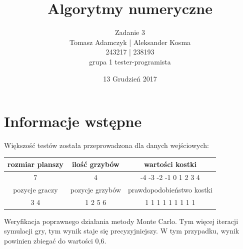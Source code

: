 \documentclass[8pt]{article}
\title{Algorytmy numeryczne}
\author{Zadanie 3 \\ Tomasz Adamczyk | Aleksander Kosma\\243217 | 238193\\grupa 1 tester-programista}
\date{13 Grudzień 2017}
\begin{document}
\maketitle 

\section*{Informacje wstępne}
Większość testów została przeprowadzona dla danych wejściowych:\\

\begin{center}
\begin{tabular}{  | c | c | c | }
  \hline
  rozmiar planszy & ilość grzybów & wartości kostki \\\hline
  7 &4& -4 -3 -2 -1 0 1 2 3 4\\\hline
   pozycje graczy & pozycje grzybów & prawdopodobieństwo kostki \\\hline
   3 4& 1 2 5 6& 1 1 1 1 1 1 1 1 1\\\hline
  \hline
\end{tabular} 
\end{center}


Weryfikacja poprawnego działania metody Monte Carlo. Tym więcej iteracji symulacji gry, tym wynik staje się precyzyjniejszy. W tym przypadku, wynik powinien zbiegać do wartości 0,6.
\begin{center}
\end{center}
\end{document}
